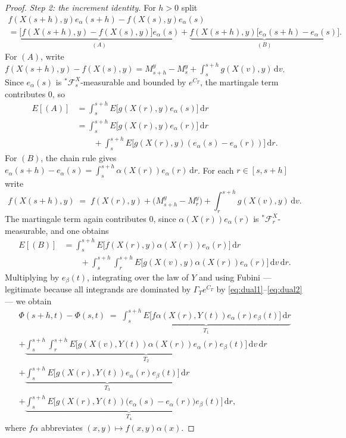 \documentclass[11pt,a4paper]{article}
\theoremstyle{plain}
\theoremstyle{definition}
\theoremstyle{remark}
\newcommand{\Filt}{\mathcal{F}}
\newcommand{\dif}{\,\mathrm{d}}
\begin{document}
\begin{proof}
  \emph{Step 2: the increment identity.}  For $h > 0$ split
  \begin{multline}
    \label{eq:dualsplit}
    f(X(s{+}h),y) e_\alpha(s{+}h) - f(X(s),y) e_\alpha(s) \\
      = \underbrace{\bigl[ f(X(s{+}h),y) - f(X(s),y) \bigr] e_\alpha(s)}_{(A)}
      + \underbrace{f(X(s{+}h),y) \bigl[ e_\alpha(s{+}h) - e_\alpha(s) \bigr]}_{(B)} .
  \end{multline}
  For $(A)$, write $f(X(s{+}h),y) - f(X(s),y) = M^y_{s+h} - M^y_s
  + \int_s^{s+h} g(X(v),y)\dif v$.  Since $e_\alpha(s)$ is
  ${}^{*}\Filt^X_s$-measurable and bounded by $e^{C_T}$, the martingale term
  contributes $0$, so
  \begin{align*}
    E[(A)] &= \int_s^{s+h} E\bigl[ g(X(r),y) e_\alpha(s) \bigr] \dif r \\
      &= \int_s^{s+h} E\bigl[ g(X(r),y) e_\alpha(r) \bigr] \dif r \\
      &\qquad + \int_s^{s+h} E\bigl[ g(X(r),y) (e_\alpha(s) - e_\alpha(r)) \bigr] \dif r .
  \end{align*}
  For $(B)$, the chain rule gives
  $e_\alpha(s{+}h) - e_\alpha(s) = \int_s^{s+h} \alpha(X(r)) e_\alpha(r) \dif r$.
  For each $r \in [s,s+h]$ write
  \[
    f(X(s{+}h),y) \;=\; f(X(r),y) + \bigl( M^y_{s+h} - M^y_r \bigr)
      + \int_r^{s+h} g(X(v),y)\dif v .
  \]
  The martingale term again contributes $0$, since $\alpha(X(r))e_\alpha(r)$ is
  ${}^{*}\Filt^X_r$-measurable, and one obtains
  \begin{align*}
    E[(B)] &= \int_s^{s+h} E\bigl[ f(X(r),y)\alpha(X(r)) e_\alpha(r) \bigr] \dif r \\
      &\qquad + \int_s^{s+h} \! \int_r^{s+h}
          E\bigl[ g(X(v),y) \alpha(X(r)) e_\alpha(r) \bigr] \dif v \dif r .
  \end{align*}
  Multiplying by $e_\beta(t)$, integrating over the law of $Y$ and using Fubini ---
  legitimate because all integrands are dominated by $\Gamma_T e^{C_T}$ by
  \eqref{eq:dual1}--\eqref{eq:dual2} --- we obtain
  \begin{multline}
    \label{eq:Fincrement}
    \Phi(s+h,t) - \Phi(s,t) \;=\;
      \underbrace{\int_s^{s+h} \!\! E\bigl[ f\alpha(X(r),Y(t)) e_\alpha(r) e_\beta(t) \bigr] \dif r}_{T_1} \\
      + \underbrace{\int_s^{s+h} \!\! \int_r^{s+h} \!\!
          E\bigl[ g(X(v),Y(t)) \alpha(X(r)) e_\alpha(r) e_\beta(t) \bigr] \dif v \dif r}_{T_2} \\
      + \underbrace{\int_s^{s+h} \!\! E\bigl[ g(X(r),Y(t)) e_\alpha(r) e_\beta(t) \bigr] \dif r}_{T_3} \\
      + \underbrace{\int_s^{s+h} \!\!
          E\bigl[ g(X(r),Y(t)) \bigl( e_\alpha(s) - e_\alpha(r) \bigr) e_\beta(t) \bigr] \dif r}_{T_4} ,
  \end{multline}
  where $f\alpha$ abbreviates $(x,y) \mapsto f(x,y)\alpha(x)$.


\end{proof}
\end{document}
